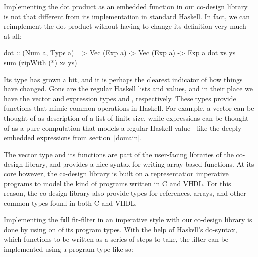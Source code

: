 \documentclass[../main.tex]{subfiles}
\begin{document}
Implementing the dot product as an embedded function in our co-design library is not that different from its implementation in standard Haskell. In fact, we can reimplement the dot product without having to change its definition very much at all:

\begin{code}
dot :: (Num a, Type a) => Vec (Exp a) -> Vec (Exp a) -> Exp a
dot xs ys = sum (zipWith (*) xs ys)
\end{code}

\noindent Its type has grown a bit, and it is perhaps the clearest indicator of how things have changed. Gone are the regular Haskell lists and values, and in their place we have the vector and expression types  and , respectively. These types provide functions that mimic common operations in Haskell. For example, a vector can be thought of as description of a list of finite size, while expressions can be thought of as a pure computation that models a regular Haskell value---like the deeply embedded expressions from section~\ref{domain}.





The vector type and its functions are part of the user-facing libraries of the co-design library, and provides a nice syntax for writing array based functions. At its core however, the co-design library is built on a representation imperative programs to model the kind of programs written in C and VHDL. For this reason, the co-design library also provide types for references, arrays, and other common types found in both C and VHDL.

Implementing the full fir-filter in an imperative style with our co-design library is done by using on of its program types. With the help of Haskell's do-syntax, which functions to be written as a series of steps to take, the filter can be implemented using a program type like so:
\end{document}
